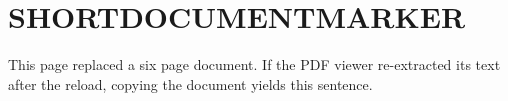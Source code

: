 \documentclass[12pt]{article}
\begin{document}
\section*{SHORTDOCUMENTMARKER}

This page replaced a six page document. If the PDF viewer re-extracted its text
after the reload, copying the document yields this sentence.
\end{document}
